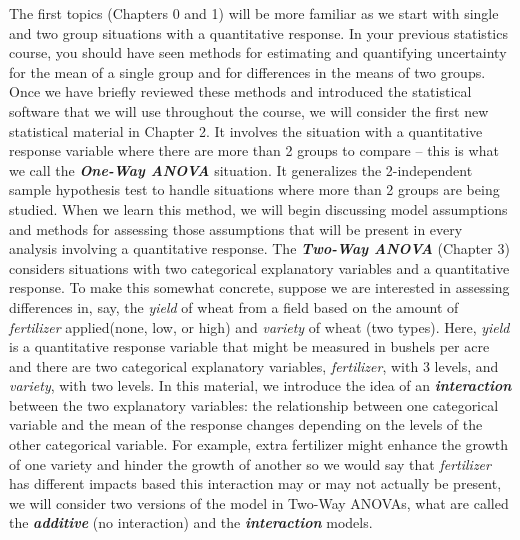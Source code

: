 \documentclass[]{article}
\begin{document}
The first topics (Chapters 0 and 1) will be more familiar as we start
with single and two group situations with a quantitative response. In
your previous statistics course, you should have seen methods for
estimating and quantifying uncertainty for the mean of a single group
and for differences in the means of two groups. Once we have briefly
reviewed these methods and introduced the statistical software that we
will use throughout the course, we will consider the first new
statistical material in Chapter 2. It involves the situation with a
quantitative response variable where there are more than 2 groups to
compare -- this is what we call the \textbf{\emph{One-Way ANOVA}}
situation. It generalizes the 2-independent sample hypothesis test to
handle situations where more than 2 groups are being studied. When we
learn this method, we will begin discussing model assumptions and
methods for assessing those assumptions that will be present in every
analysis involving a quantitative response. The \textbf{\emph{Two-Way
ANOVA}} (Chapter 3) considers situations with two categorical
explanatory variables and a quantitative response. To make this somewhat
concrete, suppose we are interested in assessing differences in, say,
the \emph{yield} of wheat from a field based on the amount of
\emph{fertilizer} applied(none, low, or high) and \emph{variety} of
wheat (two types). Here, \emph{yield} is a quantitative response
variable that might be measured in bushels per acre and there are two
categorical explanatory variables, \emph{fertilizer}, with 3 levels, and
\emph{variety}, with two levels. In this material, we introduce the idea
of an \textbf{\emph{interaction}} between the two explanatory variables:
the relationship between one categorical variable and the mean of the
response changes depending on the levels of the other categorical
variable. For example, extra fertilizer might enhance the growth of one
variety and hinder the growth of another so we would say that
\emph{fertilizer} has different impacts based this interaction may or
may not actually be present, we will consider two versions of the model
in Two-Way ANOVAs, what are called the \textbf{\emph{additive}} (no
interaction) and the \textbf{\emph{interaction}} models.
\end{document}
